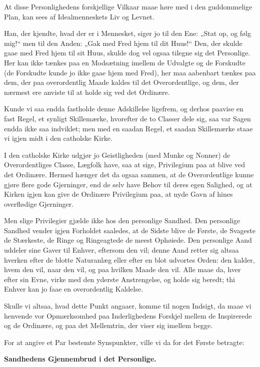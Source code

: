 \documentclass[12pt,a4paper]{book}
\newcommand{\apage}[1]{\marginnote{\footnotesize\textit{[#1]}}}
\begin{document}
At disse Personlighedens forskjellige Vilkaar maae høre med i den
guddommelige Plan, kan sees af Idealmenneskets \apage{119} Liv og Levnet.

Han, der kjendte, hvad der er i Mennesket, siger jo til den Ene: „Stat op,
og følg mig!“ men til den Anden: „Gak med Fred hjem til dit Huus!“ Den,
der skulde gaae med Fred hjem til sit Huus, skulde dog vel ogsaa tilegne
sig det Personlige. Her kan ikke tænkes paa en Modsætning imellem de
Udvalgte og de Forskudte (de Forskudte kunde jo ikke gaae hjem med Fred),
her maa aabenbart tænkes paa dem, der paa overordentlig Maade kaldes til
det Overordentlige, og dem, der nærmest ere anviste til at holde sig ved
det Ordinære.

Kunde vi saa endda fastholde denne Adskillelse ligefrem, og derhos paavise
en fast Regel, et synligt Skillemærke, hvorefter de to Classer dele sig,
saa var Sagen endda ikke saa indviklet; men med en saadan Regel, et saadan
Skillemærke staae vi igjen midt i den catholske Kirke.

I den catholske Kirke udgjør jo Geistligheden (med Munke og Nonner) de
Overordentliges Classe, Lægfolk have, saa at sige, Privilegium paa at
blive ved det Ordinære. Hermed hænger det da ogsaa sammen, at de
Overordentlige kunne gjøre flere gode Gjerninger, end de selv have Behov
til deres egen Salighed, og at Kirken igjen kan give de Ordinære
Privilegium paa, at nyde Gavn af hines overflødige Gjerninger.

Men slige Privilegier gjælde ikke hos den personlige Sandhed. Den
personlige Sandhed vender igjen Forholdet saaledes, at de Sidste blive de
Første, de Svageste de Stærkeste, de Ringe og Ringeagtede de meest
Ophøiede. Den personlige Aand uddeler sine Gaver til Enhver, eftersom den
vil; denne Aand retter sig altsaa hverken efter de blotte Naturanlæg
eller efter en blot udvortes Orden: den kalder, hvem den vil, naar den
vil, og paa hvilken Maade den vil. Alle maae da, hver efter sin Evne,
virke med den yderste \apage{120}
Anstrengelse, og holde sig beredt; thi Enhver kan jo faae en overordentlig
Kaldelse.

Skulle vi altsaa, hvad dette Punkt angaaer, komme til nogen Indsigt, da
maae vi henvende vor Opmærksomhed paa Inderlighedens Forskjel mellem de
Inspirerede og de Ordinære, og paa det Mellemtrin, der viser sig imellem
begge.

For at angive et Par bestemte Synspunkter, ville vi da for det Første
betragte:

\begin{center}
\textbf{Sandhedens Gjennembrud i det Personlige.}
\end{center}
\end{document}
